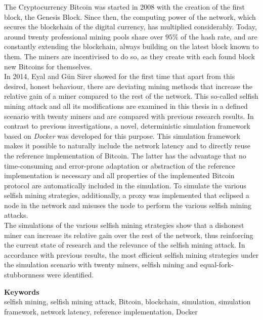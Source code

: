 The Cryptocurrency Bitcoin was started in 2008 with the creation of the first block, the Genesis Block. 
Since then, the computing power of the network, which secures the blockchain of the digital currency, has multiplied considerably.
Today, around twenty professional mining pools share over $ 95\% $ of the hash rate, and are constantly extending the blockchain, always building on the latest block known to them.
The miners are incentivised to do so, as they create with each
found block new Bitcoins for themselves.\\
In 2014, Eyal and Gün Sirer showed for the first time that apart from this desired, honest behaviour, there are deviating mining methods that increase the relative gain of a miner compared to the rest of the network.
This so-called selfish mining attack and all its modifications are examined in this thesis in a defined scenario with twenty miners and are compared with previous research results.
In contrast to previous investigations, a novel, deterministic simulation framework based on \textit{Docker} was developed for this purpose.
This simulation framework makes it possible to naturally include the network latency and to directly reuse the reference implementation of Bitcoin.
The latter has the advantage that no time-consuming and error-prone adaptation or abstraction of the reference implementation is necessary and all properties of the implemented Bitcoin protocol are automatically included in the simulation.
To simulate the various selfish mining strategies, additionally, a proxy was implemented that eclipsed a node in the network and misuses the node to perform the various selfish mining attacks.\\
The simulations of the various selfish mining strategies show that a dishonest miner can increase its relative gain over the rest of the network, thus reinforcing the current state of research and the relevance of the selfish mining attack.
In accordance with previous results, the most efficient selfish mining strategies under the simulation scenario with twenty miners, selfish mining and equal-fork-stubbornness were identified.

\bigskip
\noindent \textbf{Keywords}\\
selfish mining, selfish mining attack, Bitcoin, blockchain, simulation, simulation framework, network latency, reference implementation, Docker
